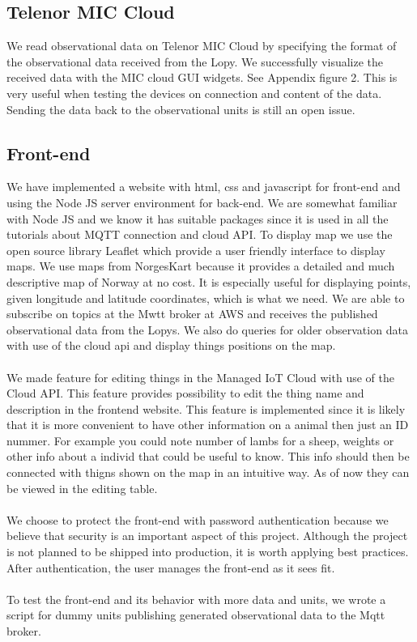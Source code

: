 		
	\subsection{Telenor MIC Cloud}
		We read observational data on Telenor MIC Cloud by specifying the format of the observational data received from the Lopy. We successfully visualize the received data with the MIC cloud GUI widgets. See Appendix figure 2. This is very useful when testing the devices on connection and content of the data. Sending the data back to the observational units is still an open issue.
	 
		
	\subsection{Front-end}
		We have implemented a website with html, css and javascript for front-end and using the Node JS server environment for back-end. We are somewhat familiar with Node JS and we know it has suitable packages since it is used in all the tutorials about MQTT connection and cloud API.  To display map we use the open source library Leaflet which provide a user friendly interface to display maps. We use maps from NorgesKart because it provides a detailed and much descriptive map of Norway at no cost. It is especially useful for displaying points, given longitude and latitude coordinates, which is what we need. We are able to subscribe on topics at the Mwtt broker at AWS and receives the published observational data from the Lopys. We also do queries for older observation data with use of the cloud api and display things positions on the map. 
		\\\\
		We made feature for editing things in the Managed IoT Cloud with use of the Cloud API. This feature provides possibility to edit the thing name and description in the frontend website. This feature is implemented since it is likely that it is more convenient to have other information on a animal then just an ID nummer. For example you could note number of lambs for a sheep, weights or other info about a individ that could be useful to know. This info should then be connected with thigns shown on the map in an intuitive way. As of now they can be viewed in the editing table.  
		\\\\
		We choose to protect the front-end with password authentication because we believe that security is an important aspect of this project. Although the project is not planned to be shipped into production, it is worth applying best practices. After authentication, the user manages the front-end as it sees fit.
		\\\\
		To test the front-end and its behavior with more data and units, we wrote a script for dummy units publishing generated observational data to the Mqtt broker.   
		
